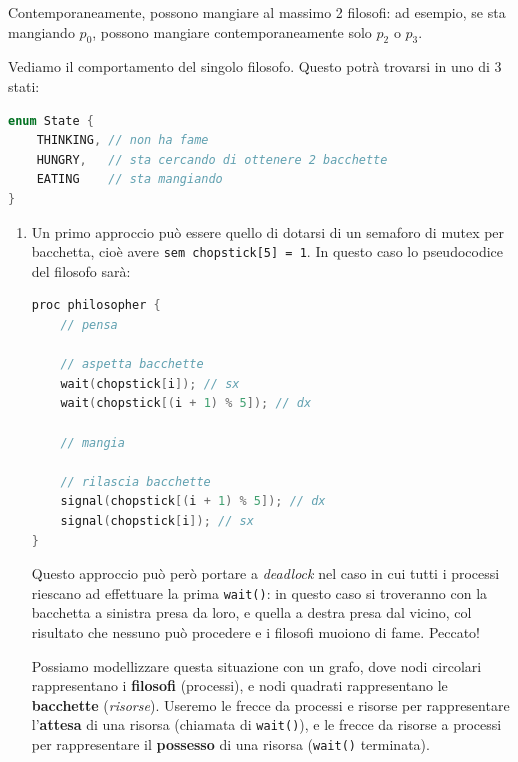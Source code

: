 \documentclass[a4paper,11pt]{article}
\begin{document}
Contemporaneamente, possono mangiare al massimo 2 filosofi: ad esempio, se sta mangiando $p_0$, possono mangiare contemporaneamente solo $p_2$ o $p_3$.

Vediamo il comportamento del singolo filosofo. Questo potrà trovarsi in uno di 3 stati:
\begin{lstlisting}[language=C++, style=codestyle]	
enum State {
	THINKING, // non ha fame
	HUNGRY,   // sta cercando di ottenere 2 bacchette
	EATING    // sta mangiando
}
\end{lstlisting}

\begin{enumerate}
	\item Un primo approccio può essere quello di dotarsi di un semaforo di mutex per bacchetta, cioè avere \lstinline|sem chopstick[5] = 1|. In questo caso lo pseudocodice del filosofo sarà:
\begin{lstlisting}[language=C++, style=codestyle]	
proc philosopher {
	// pensa

	// aspetta bacchette 
	wait(chopstick[i]); // sx
	wait(chopstick[(i + 1) % 5]); // dx

	// mangia

	// rilascia bacchette
	signal(chopstick[(i + 1) % 5]); // dx
	signal(chopstick[i]); // sx
}
\end{lstlisting}

Questo approccio può però portare a \textit{deadlock} nel caso in cui tutti i processi riescano ad effettuare la prima \lstinline|wait()|: in questo caso si troveranno con la bacchetta a sinistra presa da loro, e quella a destra presa dal vicino, col risultato che nessuno può procedere e i filosofi muoiono di fame. Peccato!

Possiamo modellizzare questa situazione con un grafo, dove nodi circolari rappresentano i \textbf{filosofi} (processi), e nodi quadrati rappresentano le \textbf{bacchette} (\textit{risorse}).
Useremo le frecce da processi e risorse per rappresentare l'\textbf{attesa} di una risorsa (chiamata di \lstinline|wait()|), e le frecce da risorse a processi per rappresentare il \textbf{possesso} di una risorsa (\lstinline|wait()| terminata).


\end{enumerate}
\end{document}
